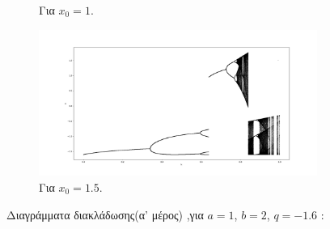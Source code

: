 \begin{figure}[h!]
\begin{subfigure}[b]{0.7\textwidth}
		\caption{Για \(x_0=1\).}
		\label{f:g29}
	\end{subfigure}
	\hfill
	\begin{subfigure}[b]{0.7\textwidth}
		\centering
		\includegraphics[width=\textwidth]{LateX images/graphs q16/g4}
		\caption{Για \(x_0=1.5\).}
		\label{f:g30}
	\end{subfigure}
	\hfill
	\caption{ Διαγράμματα διακλάδωσης(α' μέρος) ,για $a = 1$, $b = 2$, $q=-1.6$ :}
\end{figure}

